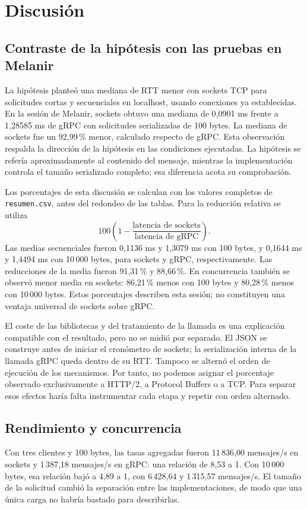 \section{Discusión}
\label{sec:discusion}

\subsection{Contraste de la hipótesis con las pruebas en Melanir}
La hipótesis planteó una mediana de RTT menor con sockets TCP para
solicitudes cortas y secuenciales en localhost, usando conexiones ya
establecidas. En la sesión de Melanir, sockets obtuvo una mediana de
0,0901 ms frente a 1,28585 ms de gRPC con solicitudes serializadas de
100 bytes. La mediana de sockets fue un 92,99\,\% menor, calculado
respecto de gRPC. Esta observación respalda la dirección de la hipótesis
en las condiciones ejecutadas. La hipótesis se refería aproximadamente
al contenido del mensaje, mientras la implementación controla el tamaño
serializado completo; esa diferencia acota su comprobación.

Los porcentajes de esta discusión se calculan con los valores completos
de \texttt{resumen.csv}, antes del redondeo de las tablas. Para la
reducción relativa se utiliza
\[
 100\left(1-\frac{\text{latencia de sockets}}{\text{latencia de gRPC}}\right).
\]
Las medias secuenciales fueron 0,1136 ms y 1,3079 ms con 100 bytes,
y 0,1644 ms y 1,4494 ms con 10\,000 bytes, para sockets y gRPC,
respectivamente. Las reducciones de la media fueron 91,31\,\% y
88,66\,\%. En concurrencia también se observó menor media en sockets:
86,21\,\% menos con 100 bytes y 80,28\,\% menos con 10\,000 bytes.
Estos porcentajes describen esta sesión; no constituyen una ventaja
universal de sockets sobre gRPC.

El coste de las bibliotecas y del tratamiento de la llamada es una
explicación compatible con el resultado, pero no se midió por separado.
El JSON se construye antes de iniciar el cronómetro de sockets; la
serialización interna de la llamada gRPC queda dentro de su RTT.
Tampoco se alternó el orden de ejecución de los mecanismos.
Por tanto, no podemos asignar el porcentaje observado exclusivamente
a HTTP/2, a Protocol Buffers o a TCP. Para separar esos efectos haría
falta instrumentar cada etapa y repetir con orden alternado.

\subsection{Rendimiento y concurrencia}
Con tres clientes y 100 bytes, las tasas agregadas fueron
11\,836,00 mensajes/s en sockets y 1\,387,18 mensajes/s en gRPC:
una relación de 8,53 a 1. Con 10\,000 bytes, esa relación bajó a
4,89 a 1, con 6\,428,64 y 1\,315,57 mensajes/s. El tamaño de la
solicitud cambió la separación entre las implementaciones, de modo que
una única carga no habría bastado para describirlas.

